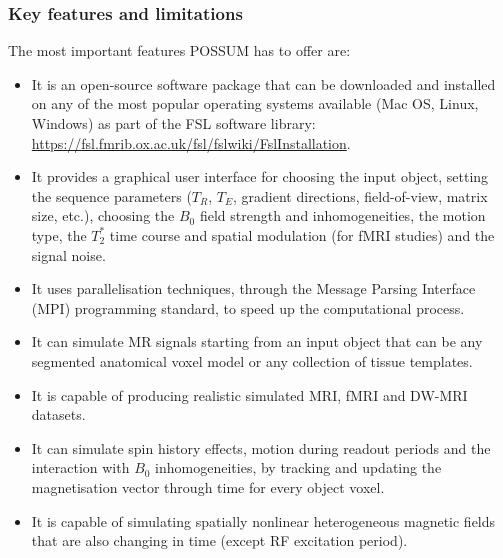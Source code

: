 \subsubsection{Key features and limitations}
The most important features POSSUM has to offer are:
\begin{itemize}
    
    \item It is an open-source software package that can be downloaded and installed on any of the most popular operating systems available (Mac OS, Linux, Windows) as part of the FSL software library: \url{https://fsl.fmrib.ox.ac.uk/fsl/fslwiki/FslInstallation}.
    
    \item It provides a graphical user interface for choosing the input object, setting the sequence parameters ($T_R$, $T_E$, gradient directions, field-of-view, matrix size, etc.), choosing the $B_0$ field strength and inhomogeneities, the motion type, the $T_2^*$ time course and spatial modulation (for fMRI studies) and the signal noise.
    
    \item It uses parallelisation techniques, through the Message Parsing Interface (MPI) programming standard, to speed up the computational process.
    
    \item It can simulate MR signals starting from an input object that can be any segmented anatomical voxel model or any collection of tissue templates. %
    
    \item It is capable of producing realistic simulated MRI, fMRI and DW-MRI datasets.
    
    \item It can simulate spin history effects, motion during readout periods and the interaction with $B_0$ inhomogeneities, by tracking and updating the magnetisation vector through time for every object voxel.
    
    \item It is capable of simulating spatially nonlinear heterogeneous magnetic fields that are also changing in time (except RF excitation period).
    
\end{itemize}

\hfill

